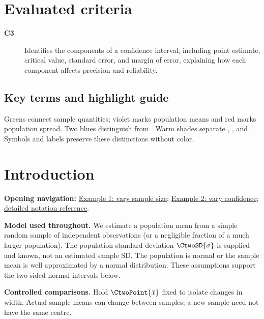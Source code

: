 \section*{Evaluated criteria}
\begin{description}
\item[\textbf{C3}] Identifies the components of a confidence interval, including point estimate, critical value, standard error, and margin of error, explaining how each component affects precision and reliability.
\end{description}

\subsection*{Key terms and highlight guide}\label{subsec:c3-key-terms}
\label{tab:highlight-legend}

Greens connect sample quantities; violet marks population means and red marks population spread. Two blues distinguish  from . Warm shades separate , ,  and . Symbols and labels preserve these distinctions without color.

\section{Introduction}\label{sec:c3-introduction}
\textbf{Opening navigation:} \hyperref[subsec:c3-transport-example]{Example 1: vary sample size};
\hyperref[subsec:c3-quick-check]{Example 2: vary confidence};
\hyperref[tab:notation-reference]{detailed notation reference}.

\textbf{Model used throughout.} We estimate a population mean from a simple random sample of independent observations (or a negligible fraction of a much larger population). The population standard deviation $\CtwoSD{\sigma}$ is supplied and known, not an estimated sample SD. The population is normal or the sample mean is well approximated by a normal distribution. These assumptions support the two-sided normal intervals below.

\textbf{Controlled comparisons.} Hold $\CtwoPoint{\bar{x}}$ fixed to isolate changes in width. Actual sample means can change between samples; a new sample need not have the same centre.
\clearpage

